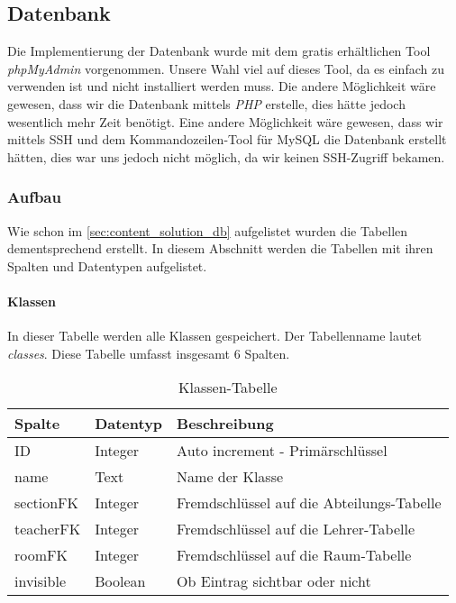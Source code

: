 \subsection{Datenbank}
Die Implementierung der Datenbank wurde mit dem gratis erhältlichen Tool \textit{phpMyAdmin} vorgenommen. Unsere Wahl viel auf dieses Tool, da es einfach zu verwenden ist und nicht installiert werden muss. Die andere Möglichkeit wäre gewesen, dass wir die Datenbank mittels \textit{PHP} erstelle, dies hätte jedoch wesentlich mehr Zeit benötigt. Eine andere Möglichkeit wäre gewesen, dass wir mittels SSH und dem Kommandozeilen-Tool für MySQL die Datenbank erstellt hätten, dies war uns jedoch nicht möglich, da wir keinen SSH-Zugriff bekamen.
\subsubsection{Aufbau} \label{sec:content_imple_db_aufbau}
%
Wie schon im \autoref{sec:content_solution_db} aufgelistet wurden die Tabellen dementsprechend erstellt. In diesem Abschnitt werden die Tabellen mit ihren Spalten und Datentypen aufgelistet.\\

\paragraph{Klassen\\}
In dieser Tabelle werden alle Klassen gespeichert. Der Tabellenname lautet \textit{classes}. Diese Tabelle umfasst insgesamt 6 Spalten.
\begin{table}[H]
\centering
\begin{tabular}{p{2.5 cm}p{2.5 cm}p{10 cm}}
   \toprule
   \textbf{Spalte} & \textbf{Datentyp} & \textbf{Beschreibung} \\
   \midrule
          ID & Integer & Auto increment - Primärschlüssel  \\
          \hline
          name & Text & Name der Klasse \\
          \hline
          sectionFK & Integer & Fremdschlüssel auf die Abteilungs-Tabelle \\
          \hline
          teacherFK & Integer & Fremdschlüssel auf die Lehrer-Tabelle\\
          \hline
          roomFK & Integer & Fremdschlüssel auf die Raum-Tabelle\\
          \hline
          invisible & Boolean & Ob Eintrag sichtbar oder nicht\\
   \bottomrule
\end{tabular}
\caption{Klassen-Tabelle}
\end{table}

